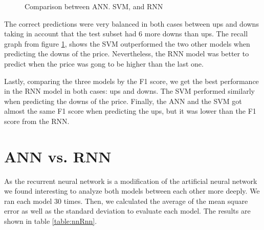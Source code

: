 \begin{figure}
\center
{} 
\caption{Comparison between ANN. SVM, and RNN}
\label{fig:comparison}
\end{figure}

The correct predictions were very balanced in both cases between ups and downs taking in account that the test subset had 6 more downs than ups. The recall graph from figure \ref{fig:comparison}, shows the SVM outperformed the two other models when predicting the downs of the price. Nevertheless, the RNN model was better to predict when the price was gong to be higher than the last one.

Lastly, comparing the three models by the F1 score, we get the best performance in the RNN model in both cases: ups and downs. The SVM performed similarly when predicting the downs of the price. Finally, the ANN and the SVM got almost the same F1 score when predicting the ups, but it was lower than the F1 score from the RNN. 

\section{ANN vs. RNN}
As the recurrent neural network is a modification of the artificial neural network we found interesting to analyze both models between each other more deeply. We ran each model 30 times. Then, we calculated the average of the mean square error as well as the standard deviation to evaluate each model. The results are shown in table 
\ref{table:nnRnn}.

